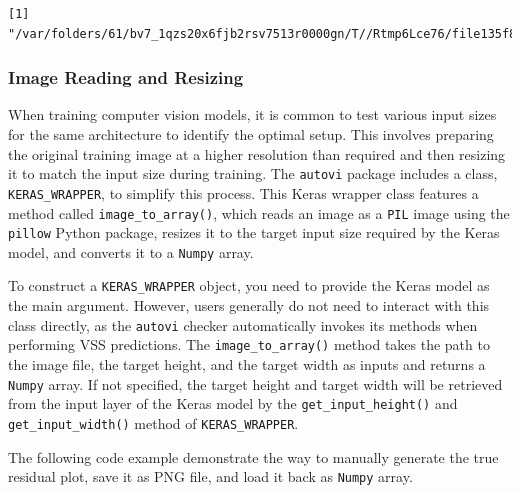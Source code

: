 \documentclass[
doublespace,
  times]{anzsauth}
\newenvironment{Shaded}{\begin{snugshade}}{\end{snugshade}}
\newcommand{\FunctionTok}[1]{\textcolor[rgb]{0.28,0.35,0.67}{#1}}
\newcommand{\NormalTok}[1]{\textcolor[rgb]{0.00,0.23,0.31}{#1}}
\newcommand{\SpecialCharTok}[1]{\textcolor[rgb]{0.37,0.37,0.37}{#1}}
\begin{document}
\begin{Shaded}
\end{Shaded}

\begin{verbatim}
[1] "/var/folders/61/bv7_1qzs20x6fjb2rsv7513r0000gn/T//Rtmp6Lce76/file135f86b4a7b69.png"
\end{verbatim}

\subsubsection{Image Reading and
Resizing}\label{image-reading-and-resizing}

When training computer vision models, it is common to test various input
sizes for the same architecture to identify the optimal setup. This
involves preparing the original training image at a higher resolution
than required and then resizing it to match the input size during
training. The \texttt{autovi} package includes a class,
\texttt{KERAS\_WRAPPER}, to simplify this process. This Keras wrapper
class features a method called \texttt{image\_to\_array()}, which reads
an image as a \texttt{PIL} image using the \texttt{pillow} Python
package, resizes it to the target input size required by the Keras
model, and converts it to a \texttt{Numpy} array.

To construct a \texttt{KERAS\_WRAPPER} object, you need to provide the
Keras model as the main argument. However, users generally do not need
to interact with this class directly, as the \texttt{autovi} checker
automatically invokes its methods when performing VSS predictions. The
\texttt{image\_to\_array()} method takes the path to the image file, the
target height, and the target width as inputs and returns a
\texttt{Numpy} array. If not specified, the target height and target
width will be retrieved from the input layer of the Keras model by the
\texttt{get\_input\_height()} and \texttt{get\_input\_width()} method of
\texttt{KERAS\_WRAPPER}.

The following code example demonstrate the way to manually generate the
true residual plot, save it as PNG file, and load it back as
\texttt{Numpy} array.
\end{document}

